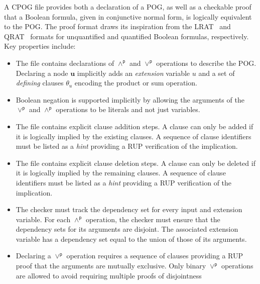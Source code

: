 \documentclass[letterpaper,USenglish,cleveref, autoref, thm-restate]{lipics-v2021}
\newcommand{\pand}{\mathbin{\land^\textsf{p}}}
\newcommand{\por}{\mathbin{\lor^\textsf{p}}}
\newcommand{\makenode}[1]{\mathbf{#1}}
\newcommand{\nodeu}{\makenode{u}}
\begin{document}

A CPOG file provides both a declaration of a POG, as well as a checkable
proof that a Boolean formula, given in conjunctive normal
form, is logically equivalent to the POG\@.
The proof format draws its inspiration from the LRAT~\cite{lrat} and
QRAT~\cite{heule:JAR2014} formats for unquantified and quantified Boolean formulas, respectively.
Key properties include:
\begin{itemize}
  \item
  The file contains declarations of $\pand$ and $\por$ operations to describe the POG.
  Declaring a node $\nodeu$ implicitly adds an \emph{extension} variable $u$ and a set of \emph{defining} clauses $\theta_{u}$
  encoding the product or sum operation.
\item Boolean negation is supported implicitly by allowing the
  arguments of the $\por$ and $\pand$ operations to be literals and not just
  variables.
\item
  The file contains explicit clause addition steps.
  A clause can only be added if it is logically implied by the existing clauses.
  A sequence of clause identifiers must be listed as a \emph{hint} providing a RUP verification of the implication.
\item
  The file contains explicit clause deletion steps.
  A clause can only be deleted if it is logically implied by the remaining clauses.
  A sequence of clause identifiers must be listed as a \emph{hint} providing a RUP verification of the implication.
\item The checker must track the dependency set for every input and
  extension variable.  For each $\pand$ operation, the checker must ensure that the dependency sets for its arguments are disjoint.
  The associated extension variable has a dependency set equal to the union of those of its arguments.
\item Declaring a $\por$ operation requires a sequence of clauses
  providing a RUP proof that the arguments are mutually exclusive.
  Only binary $\por$ operations are allowed to avoid requiring multiple proofs of disjointness
\end{itemize}
\end{document}
